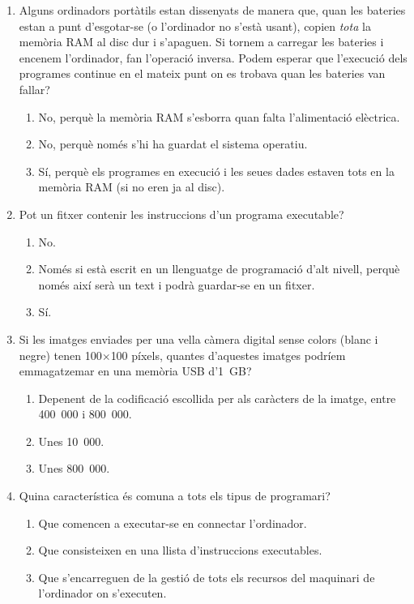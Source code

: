 \begin{enumerate}
\item Alguns ordinadors portàtils estan dissenyats de manera que, quan
  les bateries estan a punt d'esgotar-se (o l'ordinador no s'està
  usant), copien \emph{tota} la memòria RAM al disc dur i
  s'apaguen. Si tornem a carregar les bateries i encenem l'ordinador,
  fan l'operació inversa. Podem esperar que l'execució dels programes
  continue en el mateix punt on es trobava quan les bateries van
  fallar?
  \begin{enumerate}
  \item No, perquè la memòria RAM s'esborra quan falta l'alimentació
    elèctrica.
  \item No, perquè només s'hi ha guardat el sistema operatiu.
  \item Sí, perquè els programes en execució i les seues dades estaven
    tots en la memòria RAM (si no eren ja al disc).
  \end{enumerate}

\item Pot un fitxer contenir les instruccions d'un programa executable?
  \begin{enumerate}
  \item No.
  \item Només si està escrit en un llenguatge de programació d'alt
    nivell, perquè només així serà un text i podrà guardar-se en un
    fitxer.
  \item Sí.
  \end{enumerate}

\item Si les imatges enviades per una vella càmera digital sense
  colors (blanc i negre) tenen 100$\times$100 píxels, quantes
  d'aquestes imatges podríem emmagatzemar en una memòria USB d'1~GB?
  \begin{enumerate}
  \item Depenent de la codificació escollida per als caràcters de la imatge, 
    entre 400~000 i 800~000.
  \item Unes 10~000.
  \item Unes 800~000.
  \end{enumerate}

\item Quina característica és comuna a tots els tipus de programari?
  \begin{enumerate}
  \item Que comencen a executar-se en connectar l'ordinador.
  \item Que consisteixen en una llista d'instruccions executables.
  \item Que s'encarreguen de la gestió de tots els recursos del
    maquinari de l'ordinador on s'executen.
  \end{enumerate}


\end{enumerate}
